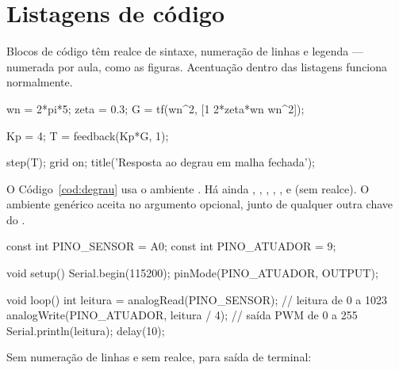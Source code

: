 \section{Listagens de código}

Blocos de código têm realce de sintaxe, numeração de linhas e legenda
 --- numerada por aula, como as figuras. Acentuação dentro das
listagens funciona normalmente.

\begin{codigomatlab}[caption={Resposta ao degrau de uma planta de segunda ordem.},
                     label={cod:degrau}]
wn   = 2*pi*5;        %
zeta = 0.3;           %
G    = tf(wn^2, [1 2*zeta*wn wn^2]);

Kp = 4;
T  = feedback(Kp*G, 1);

step(T); grid on;
title('Resposta ao degrau em malha fechada');
\end{codigomatlab}

O Código~\ref{cod:degrau} usa o ambiente . Há ainda
, , , ,
,  e  (sem realce). O ambiente
genérico  aceita  no argumento opcional, junto de
qualquer outra chave do .

\begin{codigoarduino}[caption={Leitura do sensor e acionamento do atuador.},
                      label={cod:arduino}]
const int PINO_SENSOR  = A0;
const int PINO_ATUADOR = 9;

void setup() {
  Serial.begin(115200);
  pinMode(PINO_ATUADOR, OUTPUT);
}

void loop() {
  int leitura = analogRead(PINO_SENSOR);   // leitura de 0 a 1023
  analogWrite(PINO_ATUADOR, leitura / 4);  // saída PWM de 0 a 255
  Serial.println(leitura);
  delay(10);
}
\end{codigoarduino}

Sem numeração de linhas e sem realce, para saída de terminal:


